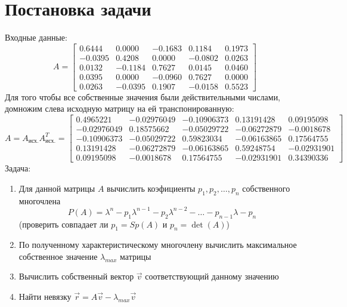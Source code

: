 \documentclass[11.4pt]{article}
\begin{document}
\section{Постановка задачи}
	Входные данные:
	\[ A=
		\left[
			\begin{array}{ccccc}
				0.6444 & 0.0000 & -0.1683 & 0.1184 & 0.1973\\
				-0.0395 & 0.4208 & 0.0000 & -0.0802 & 0.0263\\
				0.0132  & -0.1184 & 0.7627 & 0.0145 & 0.0460\\
				0.0395 & 0.0000 & -0.0960 & 0.7627 & 0.0000\\
				0.0263 & -0.0395 & 0.1907 & -0.0158 & 0.5523
			\end{array}
		\right]
	\]
	Для того чтобы все собственные значения были действительными числами, домножим слева исходную матрицу на ей транспонированную:
	\[ A=A_{\text{исх.}}A_{\text{исх.}}^T=
		\left[
			\begin{array}{ccccc}
				 0.4965221 & -0.02976049 & -0.10906373 &  0.13191428 & 0.09195098\\
 				-0.02976049 & 0.18575662 & -0.05029722 & -0.06272879 & -0.0018678\\
 				-0.10906373 & -0.05029722 & 0.59823034 & -0.06163865 &  0.17564755\\
 				 0.13191428 & -0.06272879 & -0.06163865 &  0.59248754 & -0.02931901\\
 				 0.09195098 & -0.0018678  & 0.17564755 & -0.02931901 &  0.34390336
			\end{array}
		\right]
	\]
	Задача:
	\begin{enumerate}
		\item Для данной матрицы $A$ вычислить коэфициенты $p_1,p_2,\ldots,p_n$ собственного многочлена \[P(A)=\lambda^n - p_1\lambda^{n-1} - p_2\lambda^{n-2}-\ldots-p_{n-1}\lambda - p_n\]
		\subitem (проверить совпадает ли $p_1=Sp(A)$ и $p_n = \det(A)$)
		\item По  полученному характеристическому многочлену вычислить максимальное собственное значение $\lambda_{max}$ матрицы
		\item Вычислить собственный вектор $\vec{v}$ соответствующий данному значению
		\item Найти невязку $\vec{r} = A\vec{v} - \lambda_{max}\vec{v} $
	\end{enumerate}
\end{document}

